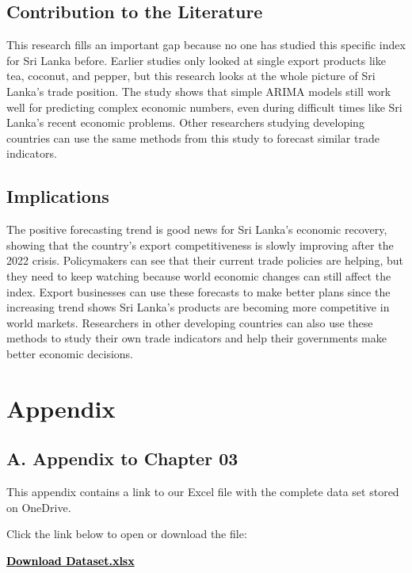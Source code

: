 \documentclass[12pt,a4paper]{report} %
\begin{document}
		\section{Contribution to the Literature}
		This research fills an important gap because no one has studied this specific index for Sri Lanka before. 
		Earlier studies only looked at single export products like tea, coconut, and pepper, but this research looks at the whole picture of Sri Lanka's trade position. 
		The study shows that simple ARIMA models still work well for predicting complex economic numbers, even during difficult times like Sri Lanka's recent economic problems. 
		Other researchers studying developing countries can use the same methods from this study to forecast similar trade indicators.
		
		\section{Implications}
		The positive forecasting trend is good news for Sri Lanka's economic recovery, showing that the country's export competitiveness is slowly improving after the 2022 crisis. 
		Policymakers can see that their current trade policies are helping, but they need to keep watching because world economic changes can still affect the index. 
		Export businesses can use these forecasts to make better plans since the increasing trend shows Sri Lanka's products are becoming more competitive in world markets. 
		Researchers in other developing countries can also use these methods to study their own trade indicators and help their governments make better economic decisions.
	
	
\clearpage
\chapter*{Appendix}
\pagestyle{empty}

\section*{A. Appendix to Chapter 03}
This appendix contains a link to our Excel file with the complete data set stored on OneDrive.

\begin{tcolorbox}[colback=gray!10, colframe=black, width=0.95\linewidth, sharp corners, boxrule=0.8mm, title={\faFileExcel~Dataset Preview}]
	\centering
	Click the link below to open or download the file:
	
	\href{https://1drv.ms/x/c/5052e625e7f51e50/Efz9E37GlIZKrV8SN2bB7dYBz1Fz8i85WacAgvEQRouHsw?e=yonf3T&nav=MTVfezNGMEJENEU5LUQ0N0ItNDFBQy1BNEEyLTYzNkBEQTFENkE1Q30}{\textbf{\textcolor{black}{Download Dataset.xlsx}}}
\end{tcolorbox}
\end{document}
